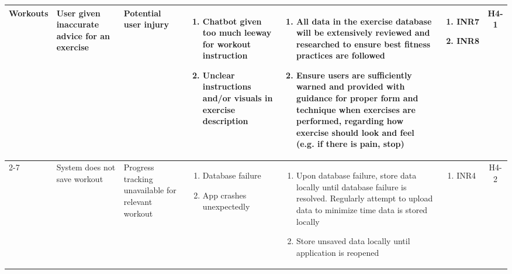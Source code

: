 \documentclass{article}
\begin{document}
\begin{longtable}{|p{1.7cm}|p{1.7cm} p{2.4cm} p{2.4cm} p{3.5cm} p{1.6cm} c|}
  Workouts & User given inaccurate advice for an exercise & Potential user injury & \vspace*{-\baselineskip}\begin{enumerate}[label=\alph*., left=0pt, nosep] \item Chatbot given too much leeway for workout instruction \item Unclear instructions and/or visuals in exercise description \end{enumerate} & \vspace*{-\baselineskip}\begin{enumerate}[label=\alph*., left=0pt, nosep] \item All data in the exercise database will be extensively reviewed and researched to ensure best fitness practices are followed \item Ensure users are sufficiently warned and provided with guidance for proper form and technique when exercises are performed, regarding how exercise should look and feel (e.g. if there is pain, stop) \end{enumerate}& \vspace*{-\baselineskip}\begin{enumerate}[label=\alph*., left=0pt, nosep] \item INR7 \item INR8 \end{enumerate} & H4-1\\
  \cline{2-7}
  & System does not save workout & Progress tracking unavailable for relevant workout & \vspace*{-\baselineskip}\begin{enumerate}[label=\alph*., left=0pt, nosep]\item Database failure \item App crashes unexpectedly \end{enumerate} & \vspace*{-\baselineskip}\begin{enumerate}[label=\alph*., left=0pt, nosep] \item Upon database failure, store data locally until database failure is resolved. Regularly attempt to upload data to minimize time data is stored locally \item Store unsaved data locally until application is reopened \end{enumerate}& \vspace*{-\baselineskip}\begin{enumerate}[label=\alph*., left=0pt, nosep] \item INR4 \end{enumerate} & H4-2\\

\end{longtable}
\end{document}
